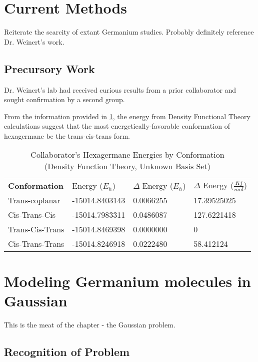 \section{Current Methods}

Reiterate the scarcity of extant Germanium studies. Probably definitely reference Dr. Weinert's work.

\subsection{Precursory Work}

Dr. Weinert's lab had received curious results from a prior collaborator and sought confirmation by a second group. 

From the information provided in \ref{fig:Collab6GeOG}, the energy from Density Functional Theory calculations suggest that the most energetically-favorable conformation of hexagermane be the trans-cis-trans form. 

\begin{table}[]
	\centering
	\caption{Collaborator's Hexagermane Energies by Conformation \\ (Density Function Theory, Unknown Basis Set)}
	\label{fig:Collab6GeOG}
	\begin{tabular}{llll}
		\textbf{Conformation} & Energy ($E_{h}$)    & $\Delta$ Energy ($E_{h}$) & $\Delta$ Energy ($\frac{Kj}{mol}$) \\ \cline{2-4} 
		Trans-coplanar        & -15014.8403143 & 0.0066255            & 17.39525025                        \\
		Cis-Trans-Cis         & -15014.7983311 & 0.0486087            & 127.6221418                        \\
		Trans-Cis-Trans       & -15014.8469398 & 0.0000000            & 0                                  \\
		Cis-Trans-Trans       & -15014.8246918 & 0.0222480            & 58.412124                         
	\end{tabular}
\end{table}

\section{Modeling Germanium molecules in Gaussian}

This is the meat of the chapter - the Gaussian problem.

\subsection{Recognition of Problem}

